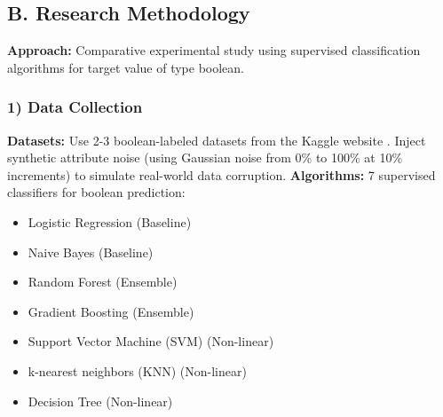 \documentclass[conference]{IEEEtran}
\begin{document}
\subsection*{B. Research Methodology}
\textbf{Approach:} Comparative experimental study using supervised classification algorithms for target value of type boolean.
\newline
\subsubsection*{1) Data Collection}
\textbf{Datasets:} Use 2-3 boolean-labeled datasets from the Kaggle website \cite{kaggle}. Inject synthetic attribute noise (using Gaussian noise from 0\% to 100\% at 10\% increments) to simulate real-world data corruption.
\newline
\newline
\textbf{Algorithms:} 7 supervised classifiers for boolean prediction:
\begin{itemize}
    \item Logistic Regression (Baseline)
    \item Naive Bayes (Baseline)
    \item Random Forest (Ensemble)
    \item Gradient Boosting (Ensemble)
    \item Support Vector Machine (SVM) (Non-linear)
    \item k-nearest neighbors (KNN) (Non-linear)
    \item Decision Tree (Non-linear)
\end{itemize}
\end{document}
